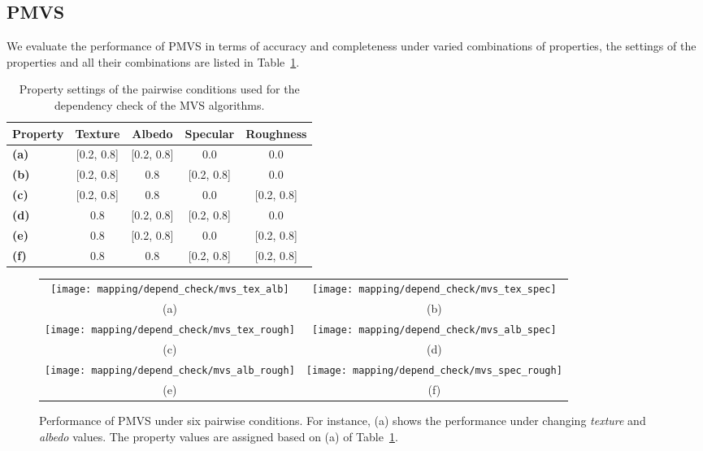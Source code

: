 \subsection{PMVS}
We evaluate the performance of PMVS in terms of accuracy and completeness under varied combinations of properties, the settings of the properties and all their combinations are listed in Table~\ref{tab:mvs_depend_check_params}.
\begin{table}[!htbp]
  \centering
  \begin{tabular}{l*{4}{c}}
  \hline
  \textbf{Property} & Texture & Albedo & Specular & Roughness\\
  \hline
  \textbf{(a)} & [0.2, 0.8] & [0.2, 0.8] & 0.0 & 0.0\\
  \textbf{(b)} & [0.2, 0.8] & 0.8 & [0.2, 0.8] & 0.0\\
  \textbf{(c)} & [0.2, 0.8] & 0.8 & 0.0 & [0.2, 0.8]\\
  \textbf{(d)} & 0.8 & [0.2, 0.8] & [0.2, 0.8] & 0.0\\
  \textbf{(e)} & 0.8 & [0.2, 0.8] & 0.0 & [0.2, 0.8]\\
  \textbf{(f)} & 0.8 & 0.8 & [0.2, 0.8] & [0.2, 0.8]\\
  \hline
  \end{tabular}
  \caption{Property settings of the pairwise conditions used for the dependency check of the MVS algorithms.}
  \label{tab:mvs_depend_check_params}
\end{table}

\begin{figure}[!htbp]
\begin{tabular}{cc}
\texttt{[image: mapping/depend\_check/mvs\_tex\_alb]}&
\texttt{[image: mapping/depend\_check/mvs\_tex\_spec]}\\
(a) & (b)\\
\texttt{[image: mapping/depend\_check/mvs\_tex\_rough]}&
\texttt{[image: mapping/depend\_check/mvs\_alb\_spec]}\\
(c) & (d)\\
\texttt{[image: mapping/depend\_check/mvs\_alb\_rough]}&
\texttt{[image: mapping/depend\_check/mvs\_spec\_rough]}\\
(e) & (f)\\
\end{tabular}
\caption{Performance of PMVS under six pairwise conditions. For instance, (a) shows the performance under changing \textit{texture} and \textit{albedo} values. The property values are assigned based on (a) of Table~\ref{tab:mvs_depend_check_params}.}
\label{fig:mvs_depend_check}
\end{figure}

